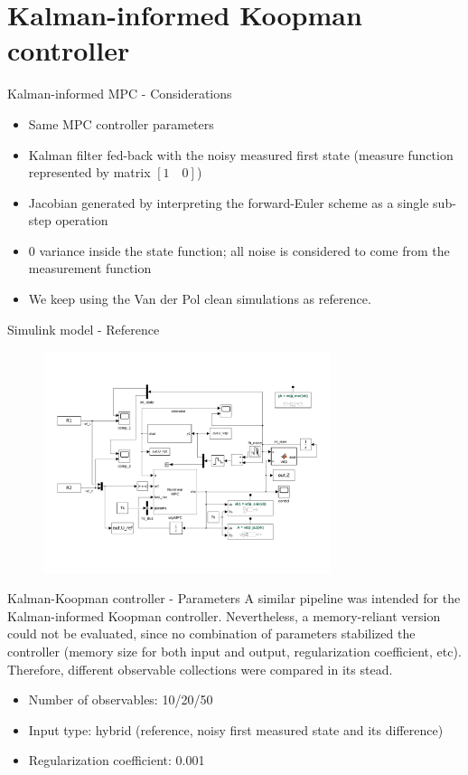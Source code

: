 \documentclass{beamer}
\begin{document}
\section{Kalman-informed Koopman controller}

\begin{frame}{Kalman-informed MPC - Considerations}
    \begin{itemize}
        \item Same MPC controller parameters
        \item Kalman filter fed-back with the noisy measured first state (measure function represented by matrix $\left[1 \quad 0\right]$)
        \item Jacobian generated by interpreting the forward-Euler scheme as a single sub-step operation
        \item 0 variance inside the state function; all noise is considered to come from the measurement function
        \item We keep using the Van der Pol clean simulations as reference.
    \end{itemize}
\end{frame}

\begin{frame}{Simulink model - Reference}
    \begin{figure}
        \centering
        \includegraphics[width=0.75\textwidth]{Simulink_Kalman.png}
    \end{figure}
\end{frame}

\begin{frame}{Kalman-Koopman controller - Parameters}
    A similar pipeline was intended for the Kalman-informed Koopman controller. Nevertheless, a memory-reliant version could not be evaluated, since no combination of parameters stabilized the controller (memory size for both input and output, regularization coefficient, etc). Therefore, different observable collections were compared in its stead.

    \begin{itemize}
        \item Number of observables: 10/20/50
        \item Input type: hybrid (reference, noisy first measured state and its difference)
        \item Regularization coefficient: 0.001
    \end{itemize}
\end{frame}
\end{document}
